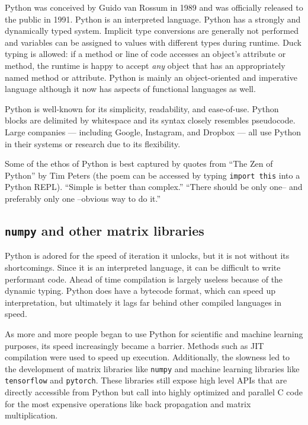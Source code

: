 \documentclass{article}
\begin{document}
Python was conceived by Guido van Rossum in 1989 and was officially released to the public in 1991. Python is an interpreted language. Python has a strongly and dynamically typed system. Implicit type conversions are generally not performed and variables can be assigned to values with different types during runtime. Duck typing is allowed: if a method or line of code accesses an object's attribute or method, the runtime is happy to accept \textit{any} object that has an appropriately named method or attribute. Python is mainly an object-oriented and imperative language although it now has aspects of functional languages as well.

Python is well-known for its simplicity, readability, and ease-of-use. Python blocks are delimited by whitespace and its syntax closely resembles pseudocode. Large companies --- including Google, Instagram, and Dropbox --- all use Python in their systems or research due to its flexibility.

Some of the ethos of Python is best captured by quotes from ``The Zen of Python'' by Tim Peters (the poem can be accessed by typing \texttt{import this} into a Python REPL). ``Simple is better than complex.'' ``There should be only one-- and preferably only one --obvious way to do it.''

\subsection{\texttt{numpy} and other matrix libraries}

Python is adored for the speed of iteration it unlocks, but it is not without its shortcomings. Since it is an interpreted language, it can be difficult to write performant code. Ahead of time compilation is largely useless because of the dynamic typing. Python does have a bytecode format, which can speed up interpretation, but ultimately it lags far behind other  compiled languages in speed.

As more and more people began to use Python for scientific and machine learning purposes, its speed increasingly became a barrier. Methods such as JIT compilation were used to speed up execution. Additionally, the slowness led to the development of matrix libraries like \texttt{numpy} and machine learning libraries like \texttt{tensorflow} and \texttt{pytorch}. These libraries still expose high level APIs that are directly accessible from Python but call into highly optimized and parallel C code for the most expensive operations like back propagation and matrix multiplication.
\end{document}
